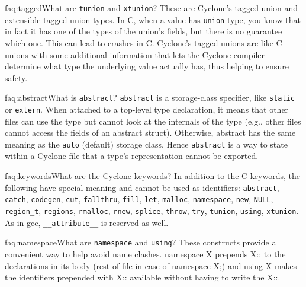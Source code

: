 \begin{faqa}{faq:tagged}{What are \texttt{tunion} and \texttt{xtunion}?}
These are Cyclone's tagged union and extensible tagged union types.
In C, when a value has \texttt{union} type, you know that in fact it
has one of the types of the union's fields, but there is no guarantee
which one.  This can lead to crashes in C\@.  Cyclone's tagged unions
are like C unions with some additional information that lets the
Cyclone compiler determine what type the underlying value actually
has, thus helping to ensure safety.
\end{faqa}

\begin{faqa}{faq:abstract}{What is \texttt{abstract}?}
\texttt{abstract} is a storage-class specifier, like \texttt{static}
or \texttt{extern}.  When attached to a top-level type declaration, it
means that other files can use the type but cannot look at the
internals of the type (e.g., other files cannot access the fields of
an abstract struct).  Otherwise, abstract has the same meaning as the
\texttt{auto} (default) storage class.  Hence \texttt{abstract} is a
way to state within a Cyclone file that a type's representation cannot
be exported.
\end{faqa}

\begin{faqa}{faq:keywords}{What are the Cyclone keywords?}
In addition to the C keywords, the following have special meaning and
cannot be used as identifiers: \texttt{abstract}, \texttt{catch},
\texttt{codegen}, \texttt{cut}, \texttt{fallthru}, \texttt{fill},
\texttt{let}, \texttt{malloc},
\texttt{namespace}, \texttt{new}, \texttt{NULL},
\texttt{region_t}, \texttt{regions},
\texttt{rmalloc}, \texttt{rnew}, \texttt{splice},
\texttt{throw}, \texttt{try}, \texttt{tunion}, \texttt{using},
\texttt{xtunion}.  As in gcc,
\texttt{__attribute__} is reserved as well.
\end{faqa}

\begin{faqa}{faq:namespace}{What are \texttt{namespace} and \texttt{using}?}
These constructs provide a convenient way to help avoid name clashes.
namespace X prepends X:: to the declarations in its body (rest of file
in case of namespace X;) and using X makes the identifiers prepended
with X:: available without having to write the X::.
\end{faqa}

